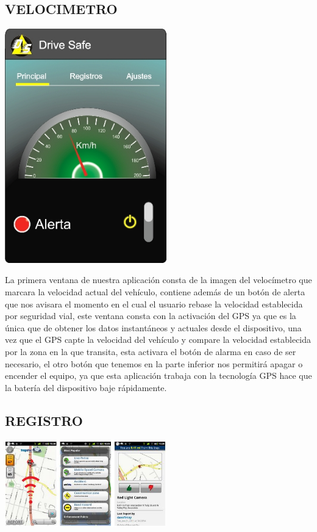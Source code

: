 \documentclass[12pt]{extbook}
\begin{document}
\subsection*{VELOCIMETRO}


\begin{center}
\includegraphics[width=7cm]{principal.jpg}
\end{center}

La primera ventana de nuestra aplicación consta de la imagen del velocímetro
que marcara la velocidad actual del vehículo, contiene además de un
botón de alerta que nos avisara el momento en el cual el usuario rebase
la velocidad establecida por seguridad vial, este ventana consta con
la activación del GPS ya que es la única que de obtener los datos
instantáneos y actuales desde el dispositivo, una vez que el GPS capte
la velocidad del vehículo y compare la velocidad establecida por la
zona en la que transita, esta activara el botón de alarma en caso
de ser necesario, el otro botón que tenemos en la parte inferior nos
permitirá apagar o encender el equipo, ya que esta aplicación trabaja
con la tecnología GPS hace que la batería del dispositivo baje rápidamente.

\subsection*{REGISTRO}

\begin{center}
\includegraphics[width=7cm]{registro.jpg}
\end{center}
\end{document}
